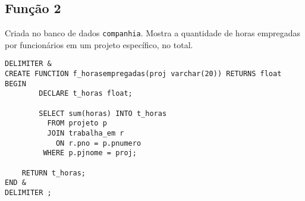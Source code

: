 \documentclass[article, a4paper, oneside, 11pt, english, brazil, sumario=tradicional]{abntex2}
\begin{document}
\subsection{Função 2}
\label{sec:org80b5485}

Criada no banco de dados \texttt{companhia}.
Mostra  a  quantidade  de  horas  empregadas  por  funcionários  em  um  projeto
específico, no total.

\begin{verbatim}
DELIMITER &
CREATE FUNCTION f_horasempregadas(proj varchar(20)) RETURNS float
BEGIN
        DECLARE t_horas float;

        SELECT sum(horas) INTO t_horas
          FROM projeto p
          JOIN trabalha_em r
            ON r.pno = p.pnumero
         WHERE p.pjnome = proj;

    RETURN t_horas;
END &
DELIMITER ;
\end{verbatim}
\end{document}
